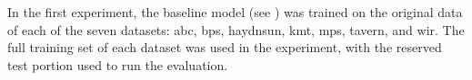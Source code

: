 
In the first experiment, the baseline model (see
) was trained on the original data
of each of the seven datasets: \gls{abc}, \gls{bps},
\gls{haydnsun}, \gls{kmt}, \gls{mps}, \gls{tavern}, and
\gls{wir}. The full training set of each dataset was used in
the experiment, with the reserved test portion used to run
the evaluation.
